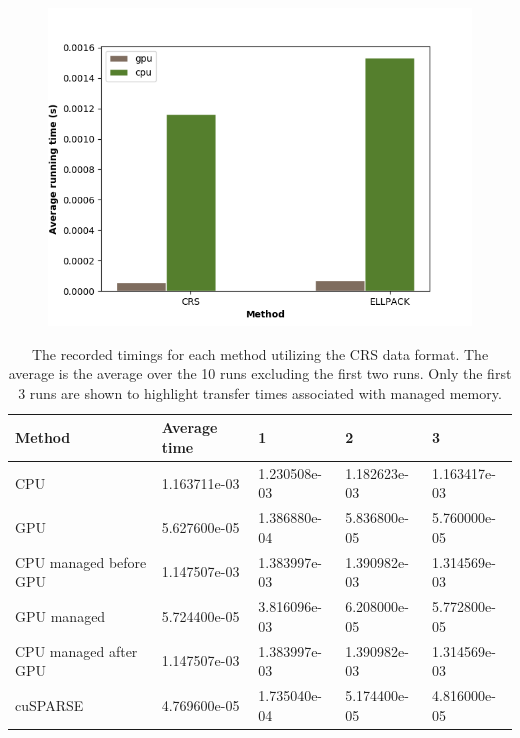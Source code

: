 \documentclass{article}
\begin{document}
\begin{figure}[h]
  \centering
  \includegraphics[width=0.8\linewidth]{running_times.png}
  \label{fig:running_times}
\end{figure}


\begin{table}[]
  \centering
  \begin{tabular}{|l|l|l|l|l|}
    \hline
    Method                 & Average time & 1            & 2            & 3            \\ \hline
    CPU                    & 1.163711e-03 & 1.230508e-03 & 1.182623e-03 & 1.163417e-03 \\ \hline
    GPU                    & 5.627600e-05 & 1.386880e-04 & 5.836800e-05 & 5.760000e-05 \\ \hline
    CPU managed before GPU & 1.147507e-03 & 1.383997e-03 & 1.390982e-03 & 1.314569e-03 \\ \hline
    GPU managed            & 5.724400e-05 & 3.816096e-03 & 6.208000e-05 & 5.772800e-05 \\ \hline
    CPU managed after GPU  & 1.147507e-03 & 1.383997e-03 & 1.390982e-03 & 1.314569e-03 \\ \hline
    cuSPARSE               & 4.769600e-05 & 1.735040e-04 & 5.174400e-05 & 4.816000e-05 \\ \hline
  \end{tabular}
  \caption{The recorded timings for each method utilizing the CRS data format.
    The average is the average over the 10 runs excluding the first two runs.
    Only the first 3 runs are shown to highlight transfer times associated with
  managed memory.}
\end{table}
\end{document}
